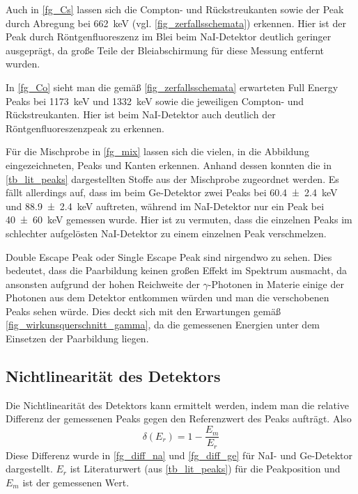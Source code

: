 \documentclass[
	a4paper,
	12pt,
	pagesize,
	ngerman
]{scrartcl}
\begin{document}
Auch in \cref{fg_Cs} lassen sich die Compton- und Rückstreukanten sowie der Peak durch Abregung bei \SI{662}{keV} (vgl. \cref{fig_zerfallsschemata}) erkennen.
Hier ist der Peak durch Röntgenfluoreszenz im Blei beim NaI-Detektor deutlich geringer ausgeprägt, da große Teile der Bleiabschirmung für diese Messung entfernt wurden.

In \cref{fg_Co} sieht man die gemäß \cref{fig_zerfallsschemata} erwarteten Full Energy Peaks bei \SI{1173}{keV} und \SI{1332}{keV} sowie die jeweiligen Compton- und Rückstreukanten.
Hier ist beim NaI-Detektor auch deutlich der Röntgenfluoreszenzpeak zu erkennen.

Für die Mischprobe in \cref{fg_mix} lassen sich die vielen, in die Abbildung eingezeichneten, Peaks und Kanten erkennen.
Anhand dessen konnten die in \cref{tb_lit_peaks} dargestellten Stoffe aus der Mischprobe zugeordnet werden.
Es fällt allerdings auf, dass im beim Ge-Detektor zwei Peaks bei \SI{60.4\pm 2.4}{keV} und \SI{88.9\pm 2.4}{keV} auftreten, während im NaI-Detektor nur ein Peak bei \SI{40\pm 60}{keV} gemessen wurde.
Hier ist zu vermuten, dass die einzelnen Peaks im schlechter aufgelösten NaI-Detektor zu einem einzelnen Peak verschmelzen.

Double Escape Peak oder Single Escape Peak sind nirgendwo zu sehen.
Dies bedeutet, dass die Paarbildung keinen großen Effekt im Spektrum ausmacht, da ansonsten aufgrund der hohen Reichweite der $\gamma$-Photonen in Materie einige der Photonen aus dem Detektor entkommen würden und man die verschobenen Peaks sehen würde.
Dies deckt sich mit den Erwartungen gemäß \cref{fig_wirkunsquerschnitt_gamma}, da die gemessenen Energien unter dem Einsetzen der Paarbildung liegen.

\subsection{Nichtlinearität des Detektors}
Die Nichtlinearität des Detektors kann ermittelt werden, indem man die relative Differenz der gemessenen Peaks gegen den Referenzwert des Peaks aufträgt.
Also
\begin{equation}
	\delta(E_r) = 1- \frac{E_m}{E_r}
\end{equation}
Diese Differenz wurde  in \cref{fg_diff_na} und \cref{fg_diff_ge} für NaI- und Ge-Detektor dargestellt.
$E_r$ ist Literaturwert (aus \cref{tb_lit_peaks}) für die Peakposition und $E_m$ ist der gemessenen Wert.
\end{document}

